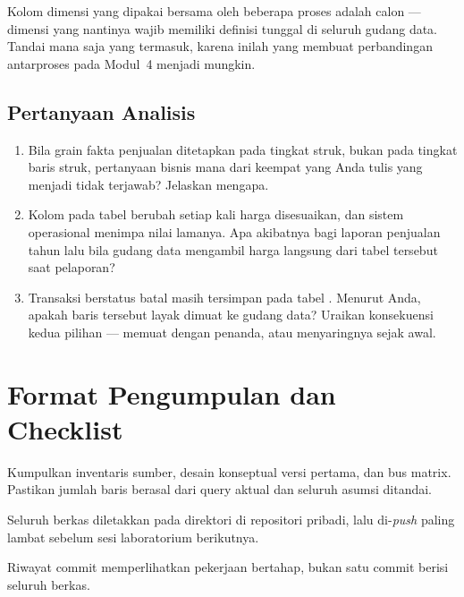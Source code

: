 Kolom dimensi yang dipakai bersama oleh beberapa proses adalah calon
 --- dimensi yang nantinya wajib memiliki definisi
tunggal di seluruh gudang data. Tandai mana saja yang termasuk, karena inilah
yang membuat perbandingan antarproses pada Modul~4 menjadi mungkin.

\subsection{Pertanyaan Analisis}

\begin{enumerate}[leftmargin=1.4em]
  \item Bila grain fakta penjualan ditetapkan pada tingkat struk, bukan pada
        tingkat baris struk, pertanyaan bisnis mana dari keempat yang Anda tulis
        yang menjadi tidak terjawab? Jelaskan mengapa.
  \item Kolom  pada tabel  berubah setiap
        kali harga disesuaikan, dan sistem operasional menimpa nilai lamanya.
        Apa akibatnya bagi laporan penjualan tahun lalu bila gudang data
        mengambil harga langsung dari tabel tersebut saat pelaporan?
  \item Transaksi berstatus batal masih tersimpan pada tabel
        . Menurut Anda, apakah baris tersebut layak dimuat
        ke gudang data? Uraikan konsekuensi kedua pilihan --- memuat dengan
        penanda, atau menyaringnya sejak awal.
\end{enumerate}

\section{Format Pengumpulan dan Checklist}

Kumpulkan inventaris sumber, desain konseptual versi pertama, dan bus matrix.
Pastikan jumlah baris berasal dari query aktual dan seluruh asumsi ditandai.

Seluruh berkas diletakkan pada direktori  di repositori
pribadi, lalu di-\emph{push} paling lambat sebelum sesi laboratorium
berikutnya.

\begin{ceklis}
  \item {}
  \item {}
  \item {}
  \item {}
  \item {}
  \item {}
  \item Riwayat commit memperlihatkan pekerjaan bertahap, bukan satu commit
        berisi seluruh berkas.
\end{ceklis}

